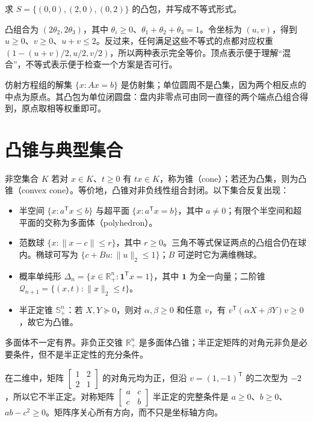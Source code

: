 \documentclass[UTF8,12pt,a4paper,fontset=fandol]{ctexbook}
\begin{document}
\begin{example}[从三个点得到一个三角形]
求 $S=\{(0,0),(2,0),(0,2)\}$ 的凸包，并写成不等式形式。
\end{example}
\begin{solve}
凸组合为 $(2\theta_2,2\theta_3)$，其中 $\theta_i\geq0$、$\theta_1+\theta_2+\theta_3=1$。令坐标为 $(u,v)$，得到 $u\geq0$、$v\geq0$、$u+v\leq2$。反过来，任何满足这些不等式的点都对应权重 $(1-(u+v)/2,u/2,v/2)$，所以两种表示完全等价。顶点表示便于理解“混合”，不等式表示便于检查一个方案是否可行。
\end{solve}

\begin{example}
仿射方程组的解集 $\{x:Ax=b\}$ 是仿射集；单位圆周不是凸集，因为两个相反点的中点为原点。其凸包为单位闭圆盘：盘内非零点可由同一直径的两个端点凸组合得到，原点取相等权重即可。
\end{example}

\section{凸锥与典型集合}

非空集合 $K$ 若对 $x\in K$、$t\geq0$ 有 $tx\in K$，称为锥（cone）；若还为凸集，则为凸锥（convex cone）。等价地，凸锥对非负线性组合封闭。以下集合反复出现：
\begin{itemize}
 \item 半空间 $\{x:a^{\mathsf T}x\leq b\}$ 与超平面 $\{x:a^{\mathsf T}x=b\}$，其中 $a\ne0$；有限个半空间和超平面的交称为多面体（polyhedron）。
 \item 范数球 $\{x:\|x-c\|\leq r\}$，其中 $r\geq0$。三角不等式保证两点的凸组合仍在球内。椭球可写为 $\{c+Bu:\|u\|_2\leq1\}$；$B$ 可逆时它为满维椭球。
 \item 概率单纯形 $\Delta_n=\{x\in\mathbb R_+^n:\mathbf1^{\mathsf T}x=1\}$，其中 $\mathbf1$ 为全一向量；二阶锥 $\mathcal Q_{n+1}=\{(x,t):\|x\|_2\leq t\}$。
 \item 半正定锥 $\mathbb S_+^n$：若 $X,Y\succeq0$，则对 $\alpha,\beta\geq0$ 和任意 $v$，有 $v^{\mathsf T}(\alpha X+\beta Y)v\geq0$，故它为凸锥。
\end{itemize}
多面体不一定有界。非负正交锥 $\mathbb R_+^n$ 是多面体凸锥；半正定矩阵的对角元非负是必要条件，但不是半正定性的充分条件。

在二维中，矩阵 $\left[\begin{smallmatrix}1&2\\2&1\end{smallmatrix}\right]$ 的对角元均为正，但沿 $v=(1,-1)^{\mathsf T}$ 的二次型为 $-2$，所以它不半正定。对称矩阵 $\left[\begin{smallmatrix}a&c\\c&b\end{smallmatrix}\right]$ 半正定的完整条件是 $a\geq0$、$b\geq0$、$ab-c^2\geq0$。矩阵序关心所有方向，而不只是坐标轴方向。
\end{document}

